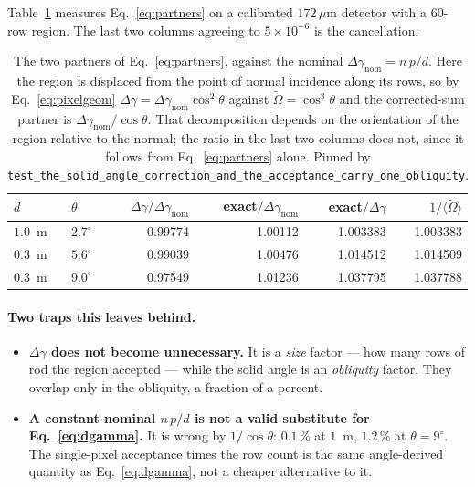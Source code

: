 \documentclass[11pt,a4paper]{article}
\newcommand{\dgam}{\Delta\gamma}
\newcommand{\Ored}{\widetilde{\Omega}}
\newcommand{\code}[1]{\texttt{\small #1}}
\begin{document}
Table~\ref{tab:f6} measures Eq.~\eqref{eq:partners} on a calibrated
$172\,\mu$m detector with a 60-row region. The last two columns
agreeing to $5\times10^{-6}$ is the cancellation.

\begin{table}[htbp]
\centering
\begin{tabular}{@{}llrrrr@{}}
\toprule
$d$ & $\theta$ & $\dgam/\dgam_{\mathrm{nom}}$ & exact$/\dgam_{\mathrm{nom}}$
    & exact$/\dgam$ & $1/\langle\Ored\rangle$ \\
\midrule
$1.0$~m & $2.7^{\circ}$ & 0.99774 & 1.00112 & 1.003383 & 1.003383 \\
$0.3$~m & $5.6^{\circ}$ & 0.99039 & 1.00476 & 1.014512 & 1.014509 \\
$0.3$~m & $9.0^{\circ}$ & 0.97549 & 1.01236 & 1.037795 & 1.037788 \\
\bottomrule
\end{tabular}
\caption{The two partners of Eq.~\eqref{eq:partners}, against the nominal
$\dgam_{\mathrm{nom}} = n\,p/d$. Here the region is displaced from the point
of normal incidence along its rows, so by Eq.~\eqref{eq:pixelgeom}
$\dgam = \dgam_{\mathrm{nom}}\cos^{2}\theta$ against $\Ored = \cos^{3}\theta$
and the corrected-sum partner is $\dgam_{\mathrm{nom}}/\cos\theta$. That
decomposition depends on the orientation of the region relative to the normal;
the ratio in the last two columns does not, since it follows from
Eq.~\eqref{eq:partners} alone. Pinned by
\code{test\_the\_solid\_angle\_correction\_and\_the\_acceptance\_carry\_one\_obliquity}.}
\label{tab:f6}
\end{table}

\paragraph{Two traps this leaves behind.}
\begin{itemize}[leftmargin=1.4em]
\item \textbf{$\dgam$ does not become unnecessary.} It is a \emph{size} factor
  --- how many rows of rod the region accepted --- while the solid angle is an
  \emph{obliquity} factor. They overlap only in the obliquity, a fraction of a
  percent.
\item \textbf{A constant nominal $n\,p/d$ is not a valid substitute for
  Eq.~\eqref{eq:dgamma}.} It is wrong by $1/\cos\theta$: $0.1\,\%$ at $1$~m,
  $1.2\,\%$ at $\theta = 9^{\circ}$. The single-pixel acceptance times the row
  count is the same angle-derived quantity as Eq.~\eqref{eq:dgamma}, not a
  cheaper alternative to it.
\end{itemize}
\end{document}
